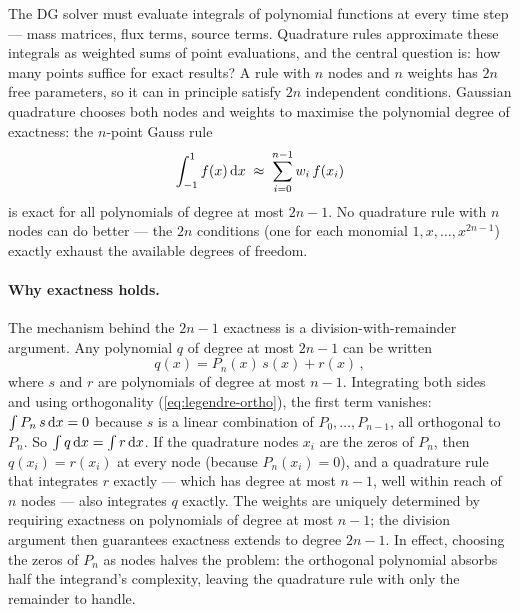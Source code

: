 The DG solver must evaluate integrals of polynomial functions at every
time step --- mass matrices, flux terms, source terms.  Quadrature
rules approximate these integrals as weighted sums of point
evaluations, and the central question is: how many points suffice for
exact results?  A rule with $n$ nodes and $n$ weights has $2n$ free
parameters, so it can in principle satisfy $2n$ independent
conditions.  Gaussian quadrature chooses both nodes and weights to
maximise the polynomial degree of exactness: the $n$-point Gauss rule
%
\begin{equation}
  \int_{-1}^{1} f(x)\,\mathrm{d} x
  \;\approx\; \sum_{i=0}^{n-1} w_i\,f(x_i)
  \label{eq:gauss-quadrature}
\end{equation}
%
is exact for all polynomials of degree at most $2n - 1$.  No
quadrature rule with $n$ nodes can do better --- the $2n$ conditions
(one for each monomial $1, x, \ldots, x^{2n-1}$) exactly exhaust the
available degrees of freedom.

\paragraph{Why exactness holds.}

The mechanism behind the $2n - 1$ exactness is a
division-with-remainder argument.  Any polynomial $q$ of degree at
most $2n - 1$ can be written
%
\begin{equation}
  q(x) = P_n(x)\,s(x) + r(x) \,,
  \label{eq:gauss-division}
\end{equation}
%
where $s$ and $r$ are polynomials of degree at most $n - 1$.
Integrating both sides and using orthogonality
(\cref{eq:legendre-ortho}), the first term vanishes:
$\int P_n\,s\,\mathrm{d} x = 0$ because $s$ is a linear combination of
$P_0, \ldots, P_{n-1}$, all orthogonal to $P_n$.  So
$\int q\,\mathrm{d} x = \int r\,\mathrm{d} x$.  If the quadrature nodes $x_i$ are
the zeros of $P_n$, then $q(x_i) = r(x_i)$ at every node (because
$P_n(x_i) = 0$), and a quadrature rule that integrates $r$ exactly
--- which has degree at most $n - 1$, well within reach of $n$ nodes
--- also integrates $q$ exactly.  The weights are uniquely determined
by requiring exactness on polynomials of degree at most $n - 1$; the
division argument then guarantees exactness extends to degree
$2n - 1$.  In effect, choosing the zeros of $P_n$ as nodes halves
the problem: the orthogonal polynomial absorbs half the integrand's
complexity, leaving the quadrature rule with only the remainder to
handle.

